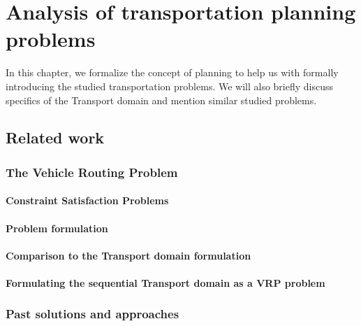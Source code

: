 \chapter{Analysis of transportation planning problems}

In this chapter, we formalize the concept of planning to help us with formally introducing the studied transportation problems. We will also briefly discuss specifics of the Transport domain and mention similar studied problems.

\section{Related work}



\subsection{The Vehicle Routing Problem}

 \citep{Dantzig1959}

 \citep{Braekers2016}

 \citep{Montoya-Torres2015}

 \citep{ResearchGroup2013}

\subsubsection{Constraint Satisfaction Problems}

\subsubsection{Problem formulation}

\subsubsection{Comparison to the Transport domain formulation}

\subsubsection{Formulating the sequential Transport domain as a VRP problem}


\subsection{Past solutions and approaches}

